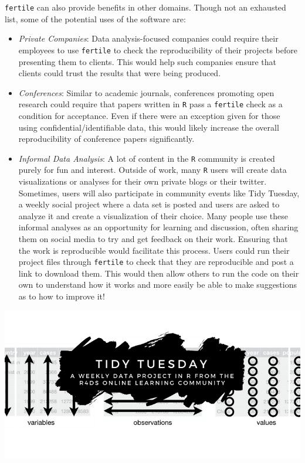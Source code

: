 \documentclass[12pt,twoside]{reedthesis}
\begin{document}
\texttt{fertile} can also provide benefits in other domains. Though not an exhausted list, some of the potential uses of the software are:
\begin{itemize}
\item
  \emph{Private Companies}: Data analysis-focused companies could require their employees to use \texttt{fertile} to check the reproducibility of their projects before presenting them to clients. This would help such companies ensure that clients could trust the results that were being produced.
\item
  \emph{Conferences}: Similar to academic journals, conferences promoting open research could require that papers written in \texttt{R} pass a \texttt{fertile} check as a condition for acceptance. Even if there were an exception given for those using confidential/identifiable data, this would likely increase the overall reproducibility of conference papers significantly.
\item
  \emph{Informal Data Analysis}: A lot of content in the \texttt{R} community is created purely for fun and interest. Outside of work, many \texttt{R} users will create data visualizations or analyses for their own private blogs or their twitter. Sometimes, users will also participate in community events like Tidy Tuesday, a weekly social project where a data set is posted and users are asked to analyze it and create a visualization of their choice. Many people use these informal analyses as an opportunity for learning and discussion, often sharing them on social media to try and get feedback on their work. Ensuring that the work is reproducible would facilitate this process. Users could run their project files through \texttt{fertile} to check that they are reproducible and post a link to download them. This would then allow others to run the code on their own to understand how it works and more easily be able to make suggestions as to how to improve it!
\end{itemize}
\includegraphics[width=1\linewidth]{figure/tidytuesday}
\end{document}
